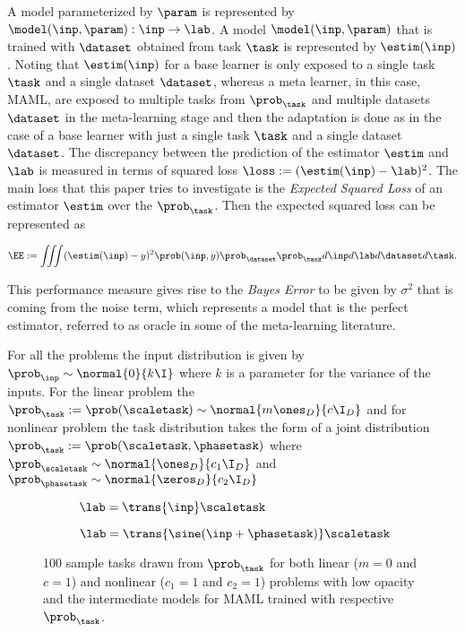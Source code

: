 A model parameterized by $\param$ is represented by $\model(\inp, \param):\inp\to\lab$. A model $\model(\inp, \param)$ that is trained with $\dataset$ obtained from  task $\task$ is represented by $\estim(\inp)$. Noting that $\estim(\inp)$ for a base learner is only exposed to a single task $\task$ and a single dataset $\dataset$, whereas a meta learner, in this case, MAML, are exposed to multiple tasks from $\prob_\task$ and multiple datasets $\dataset$ in the meta-learning stage and then the adaptation is done as in the case of a base learner with just a single task $\task$ and a single dataset $\dataset$.  The discrepancy between the prediction of the estimator $\estim$ and $\lab$ is measured in terms of squared loss $\loss:=(\estim(\inp)-\lab)^2$. The main loss that this paper tries to investigate is the \textit{Expected Squared Loss} of an estimator $\estim$ over the $\prob_{\task}$. Then the expected squared loss can be represented as

\begin{equation}\label{eq:ee}
  \EE:= \iiint(\estim(\inp) - y)^2\prob(\inp, y)\prob_{\dataset}\prob_{\task} d\inp d\lab d\dataset d\task.
\end{equation}


This performance measure gives rise to the \textit{Bayes Error} to be given by $\sigma^2$ that is coming from the noise term, which represents a model that is the perfect estimator, referred to as oracle in some of the meta-learning literature.

For all the problems the input distribution is given by $\prob_\inp\sim\normal{0}{k\I}$ where $k$ is a parameter for the variance of the inputs. For the linear problem the $\prob_\task:=\prob(\scaletask)\sim\normal{{m\ones_{D}}}{{c\I_{D}}}$ and for nonlinear problem the task distribution takes the form of a joint distribution $\prob_\task:=\prob(\scaletask, \phasetask)$ where $\prob_{\scaletask}\sim\normal{\ones_{D}}{c_1\I_{D}}$ and $\prob_{\phasetask}\sim\normal{\zeros_{D}}{c_2\I_{D}}$

\begin{figure}[ht!]
  \centering
  \begin{subfigure}[b]{0.49\textwidth}
    \centering
    \caption{$\lab = \trans{\inp}\scaletask$}
    \label{fig:lintasks}
  \end{subfigure}
  \begin{subfigure}[b]{0.49\textwidth}
    \centering
    \caption{$\lab = \trans{\sine(\inp+\phasetask)}\scaletask$}
    \label{fig:nonlintasks}
  \end{subfigure}
  \caption{100 sample tasks drawn from $\prob_\task$ for both linear ($m=0$ and $c=1$) and nonlinear ($c_1=1$ and $c_2=1$) problems with low opacity and the intermediate models for MAML trained with respective $\prob_\task$.}
\end{figure}

